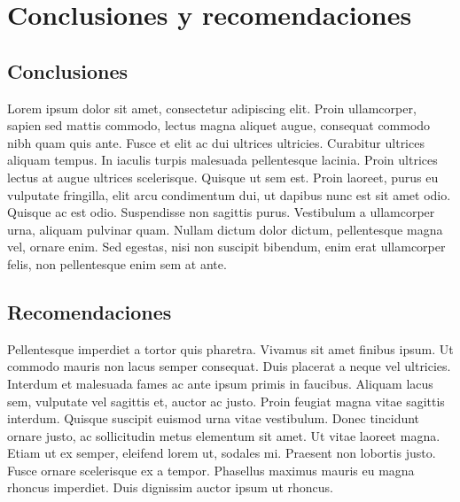 \documentclass[letterpaper,oneside,openany,11pt]{book}
\begin{document}
\chapter{Conclusiones y recomendaciones}\label{cap.conclusiones}
\section{Conclusiones}
\noindent Lorem ipsum dolor sit amet, consectetur adipiscing elit. Proin ullamcorper, sapien sed mattis commodo, lectus magna aliquet augue, consequat commodo nibh quam quis ante. Fusce et elit ac dui ultrices ultricies. Curabitur ultrices aliquam tempus. In iaculis turpis malesuada pellentesque lacinia. Proin ultrices lectus at augue ultrices scelerisque. Quisque ut sem est. Proin laoreet, purus eu vulputate fringilla, elit arcu condimentum dui, ut dapibus nunc est sit amet odio. Quisque ac est odio. Suspendisse non sagittis purus. Vestibulum a ullamcorper urna, aliquam pulvinar quam. Nullam dictum dolor dictum, pellentesque magna vel, ornare enim. Sed egestas, nisi non suscipit bibendum, enim erat ullamcorper felis, non pellentesque enim sem at ante. \\

\section{Recomendaciones}
\noindent Pellentesque imperdiet a tortor quis pharetra. Vivamus sit amet finibus ipsum. Ut commodo mauris non lacus semper consequat. Duis placerat a neque vel ultricies. Interdum et malesuada fames ac ante ipsum primis in faucibus. Aliquam lacus sem, vulputate vel sagittis et, auctor ac justo. Proin feugiat magna vitae sagittis interdum. Quisque suscipit euismod urna vitae vestibulum. Donec tincidunt ornare justo, ac sollicitudin metus elementum sit amet. Ut vitae laoreet magna. Etiam ut ex semper, eleifend lorem ut, sodales mi. Praesent non lobortis justo. Fusce ornare scelerisque ex a tempor. Phasellus maximus mauris eu magna rhoncus imperdiet. Duis dignissim auctor ipsum ut rhoncus. \\



\cleardoublepage
{}

\end{document}
